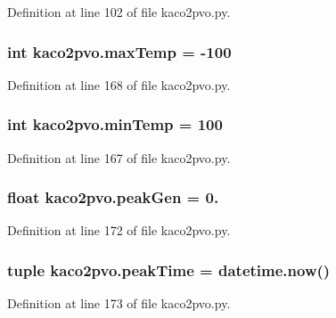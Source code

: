 Definition at line 102 of file kaco2pvo.\+py.

\hypertarget{namespacekaco2pvo_afc870a268fa08b616db16d50b19bbd90}{}
\subsubsection[{max\+Temp}]{\setlength{\rightskip}{0pt plus 5cm}int kaco2pvo.\+max\+Temp = -\/100}\label{namespacekaco2pvo_afc870a268fa08b616db16d50b19bbd90}


Definition at line 168 of file kaco2pvo.\+py.

\hypertarget{namespacekaco2pvo_affe215a515246118e429d007acb723a8}{}
\subsubsection[{min\+Temp}]{\setlength{\rightskip}{0pt plus 5cm}int kaco2pvo.\+min\+Temp = 100}\label{namespacekaco2pvo_affe215a515246118e429d007acb723a8}


Definition at line 167 of file kaco2pvo.\+py.

\hypertarget{namespacekaco2pvo_a0cce2912748ba57bbc1609834c0acbc1}{}
\subsubsection[{peak\+Gen}]{\setlength{\rightskip}{0pt plus 5cm}float kaco2pvo.\+peak\+Gen = 0.}\label{namespacekaco2pvo_a0cce2912748ba57bbc1609834c0acbc1}


Definition at line 172 of file kaco2pvo.\+py.

\hypertarget{namespacekaco2pvo_aee6595766d5a3ac626e685c7dbfa4ed8}{}
\subsubsection[{peak\+Time}]{\setlength{\rightskip}{0pt plus 5cm}tuple kaco2pvo.\+peak\+Time = datetime.\+now()}\label{namespacekaco2pvo_aee6595766d5a3ac626e685c7dbfa4ed8}


Definition at line 173 of file kaco2pvo.\+py.

\hypertarget{namespacekaco2pvo_acdd697a7c8e4d2d9d64dc216df3eca02}{}
